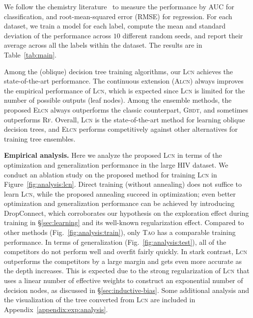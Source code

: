 \documentclass{article} \usepackage{iclr2020_conference,times}
\newcommand{\xref}[1]{\S\ref{#1}}
\begin{document}
We follow the chemistry literature~\citep{wu2018moleculenet} to measure the performance by AUC for classification, and root-mean-squared error (RMSE) for regression. For each dataset, we train a model for each label, compute the mean and standard deviation of the performance across $10$ different random seeds, and report their average across all the labels within the dataset. The results are in Table~\ref{tab:main}. 

Among the (oblique) decision tree training algorithms, our \textsc{Lcn} achieves the state-of-the-art performance. The continuous extension (\textsc{Alcn}) always improves the empirical performance of \textsc{Lcn}, which is expected since \textsc{Lcn} is limited for the number of possible outputs (leaf nodes). Among the ensemble methods, the proposed \textsc{Elcn} always outperforms the classic counterpart, \textsc{Gbdt}, and sometimes outperforms \textsc{Rf}. Overall, \textsc{Lcn} is the state-of-the-art method for learning oblique decision trees, and \textsc{Elcn} performs competitively against other alternatives for training tree ensembles. 




\textbf{Empirical analysis.} Here we analyze the proposed \textsc{Lcn} in terms of the optimization and generalization performance in the large HIV dataset. We conduct an ablation study on the proposed method for training \textsc{Lcn} in Figure~\ref{fig:analysis:lcn}. Direct training (without annealing) does not suffice to learn \textsc{Lcn}, while the proposed annealing succeed in optimization; even better optimization and generalization performance can be achieved by introducing DropConnect, which corroborates our hypothesis on the exploration effect during training in \xref{sec:learning} and its well-known regularization effect. Compared to other methods (Fig.~\ref{fig:analysis:train}), only \textsc{Tao} has a comparable training performance. In terms of generalization (Fig.~\ref{fig:analysis:test}), all of the competitors do not perform well and overfit fairly quickly. In stark contrast, \textsc{Lcn} outperforms the competitors by a large margin and gets even more accurate as the depth increases. This is expected due to the strong regularization of \textsc{Lcn} that uses a linear number of effective weights to construct an exponential number of decision nodes, as discussed in \xref{sec:inductive-bias}. Some additional analysis and the visualization of the tree converted from \textsc{Lcn} are included in Appendix~\ref{appendix:exp:analysis}.\!\!\!\!\!
\end{document}
